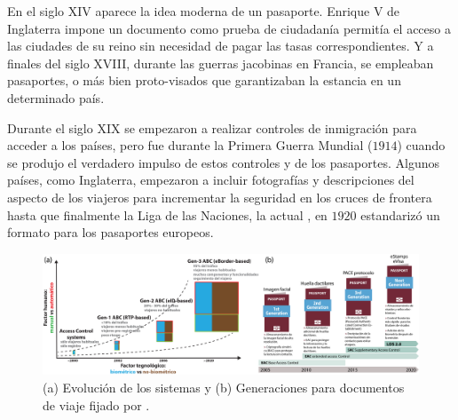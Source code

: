 En el siglo XIV aparece la idea moderna de un pasaporte. Enrique V de Inglaterra impone un documento como prueba de ciudadanía permitía el acceso a las ciudades de su reino sin necesidad de pagar las tasas correspondientes. Y a finales del siglo XVIII, durante las guerras jacobinas en Francia, se empleaban pasaportes, o más bien proto-visados que garantizaban la estancia en un determinado país.

Durante el siglo XIX se empezaron a realizar controles de inmigración para acceder a los países, pero fue durante la Primera Guerra Mundial ($1914$) cuando se produjo el verdadero impulso de estos controles y de los pasaportes. Algunos países, como Inglaterra, empezaron a incluir fotografías y descripciones del aspecto de los viajeros para incrementar la seguridad en los cruces de frontera hasta que finalmente la Liga de las Naciones, la actual , en $1920$ estandarizó un formato para los pasaportes europeos. 




\begin{figure}[ht]
     \centering
     \includegraphics[width=\textwidth]{ch-sistemasABC/images/ch-introduccion/GENEALOGIAS_DE_ABCS_Y_PASAPORTES.png}
     \caption{(a) Evolución de los sistemas  y (b) Generaciones para documentos de viaje fijado por \cite{ICAOOnline}.}
     \label{fig:generacionesABC_Pasaportes}
\end{figure}

